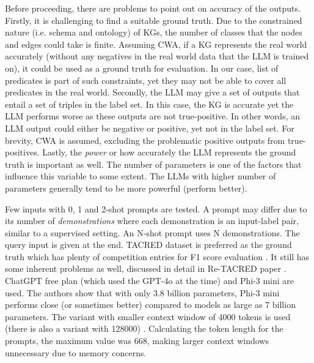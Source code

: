 \documentclass{article}
\begin{document}
Before proceeding, there are problems to point out on accuracy of the outputs. Firstly, it is challenging to find a suitable ground truth. Due to the constrained nature (i.e. schema and ontology) of KGs, the number of classes that the nodes and edges could take is finite. Assuming CWA, if a KG represents the real world accurately (without any negatives in the real world data that the LLM is trained on), it could be used as a ground truth for evaluation. In our case, list of predicates is part of such constraints, yet they may not be able to cover all predicates in the real world. Secondly, the LLM may give a set of outputs that entail a set of triples in the label set. In this case, the KG is accurate yet the LLM performs worse as these outputs are not true-positive. In other words, an LLM output could either be negative or positive, yet not in the label set. For brevity, CWA is assumed, excluding the problematic positive outputs from true-positives. Lastly, the \textit{power} or how accurately the LLM represents the ground truth is important as well. The number of parameters is one of the factors that influence this variable to some extent. The LLMs with higher number of parameters generally tend to be more powerful (perform better). 

Few inputs with 0, 1 and 2-shot prompts are tested. A prompt may differ due to its number of \textit{demonstrations} where each demonstration is an input-label pair, similar to a supervised setting. An N-shot prompt uses N demonstrations. The query input is given at the end. TACRED dataset is preferred as the ground truth which has plenty of competition entries for F1 score evaluation \cite{zhang_position-aware_2017,noauthor_tacred_nodate}. It still has some inherent problems as well, discussed in detail in Re-TACRED paper \cite{stoica_re-tacred_2021}. ChatGPT free plan (which used the GPT-4o at the time) and Phi-3 mini are used. The authors show that with only 3.8 billion parameters, Phi-3 mini performs close (or sometimes better) compared to models as large as 7 billion parameters. The variant with smaller context window of 4000 tokens is used (there is also a variant with 128000) \cite{abdin_phi-3_2024}. Calculating the token length for the prompts, the maximum value was 668, making larger context windows unnecessary due to memory concerns. 
\end{document}
